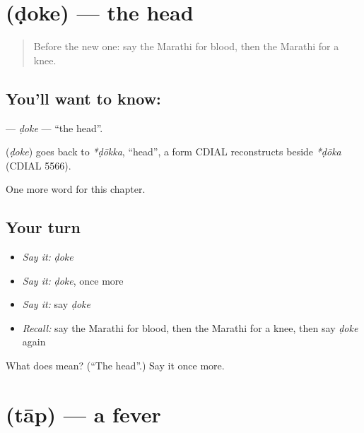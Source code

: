 \section[\texorpdfstring{\mr{डोके} (ḍoke)}{डोके (ḍoke)}]{ (ḍoke) — the head}

\label{lesson:MR-C72-doke}



\begin{quote}
Before the new one: say the Marathi for blood, then the Marathi for a knee.
\end{quote}

\subsection*{You'll want to know: }
\textbf{} — \emph{ḍoke} — \textquotedblleft{}the head\textquotedblright{}.

\begin{cousinweb}
\textbf{} (\emph{ḍoke}) goes back to \emph{*ḍōkka}, \textquotedblleft{}head\textquotedblright{}, a form CDIAL reconstructs beside \emph{*ḍōka} (CDIAL 5566).
\end{cousinweb}

\begin{grammarlens}[title={What you've built}]
One more word for this chapter.
\end{grammarlens}

\subsection*{Your turn}
\begin{itemize}
\raggedright
  \item \emph{Say it:} \emph{ḍoke}
  \item \emph{Say it:} \emph{ḍoke}, once more
  \item \emph{Say it:} say \emph{ḍoke}
  \item \emph{Recall:} say the Marathi for blood, then the Marathi for a knee, then say \emph{ḍoke} again
\end{itemize}

\begin{tcolorbox}[breakable,colback=teal!4,colframe=teal!35!black,title={Before you move on}]
What does  mean? (\textquotedblleft{}The head\textquotedblright{}.) Say it once more.
\end{tcolorbox}
\section[\texorpdfstring{\mr{ताप} (tāp)}{ताप (tāp)}]{ (tāp) — a fever}

